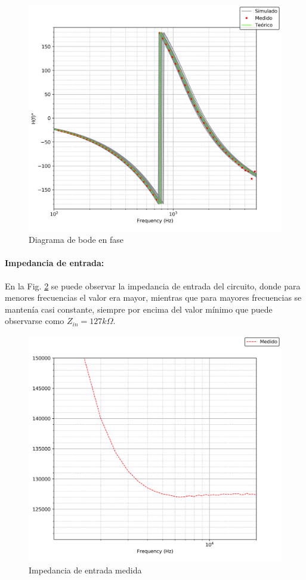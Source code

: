 \begin{figure}[H]
    \centering
    \includegraphics[scale=0.7]{../EJ1/Recursos/bessel_bode_fase.png}
    \caption{Diagrama de bode en fase}
    \label{fig:bessel_bode_fase}
\end{figure}

\paragraph{Impedancia de entrada:} En la Fig. \ref{bessel_impedancia_entrada} se puede observar la impedancia de entrada del circuito, donde para menores frecuencias
el valor era mayor, mientras que para mayores frecuencias se manten\'ia casi constante, siempre por encima del valor m\'inimo que puede observarse como $Z_{in} = 127k\Omega$.

\begin{figure}[H]
    \centering
    \includegraphics[scale=0.1]{../EJ1/Recursos/bessel_impedancia_entrada.png}
    \caption{Impedancia de entrada medida}
    \label{bessel_impedancia_entrada}
\end{figure}

